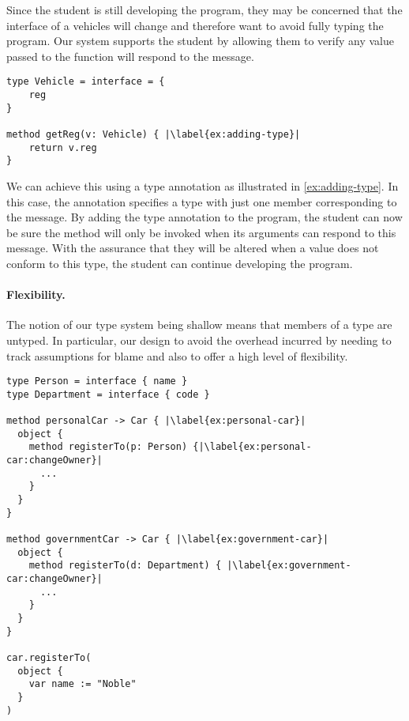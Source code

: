 Since the student is still developing the program, 
they may be concerned that the interface of a vehicles will change 
and therefore want to avoid fully typing the program.
Our system supports the student by allowing them to verify
any value passed to the  function will respond
to the  message. 


\begin{lstlisting}[caption={Adding a type annotation to a method parameter.},escapechar=|,float,floatplacement=htbp]
type Vehicle = interface = {
    reg    
}

method getReg(v: Vehicle) { |\label{ex:adding-type}|
    return v.reg
}
\end{lstlisting}

We can achieve this using a type annotation 
as illustrated in \cref{ex:adding-type}. 
In this case, 
the annotation specifies a type with just one member
corresponding to the  message.
By adding the type annotation to the program, 
the student can now be sure the  method
will only be invoked when its arguments can respond to this message.
With the assurance that they will be altered when a value 
does not conform to this type,
the student can continue developing the program.

\paragraph{Flexibility.}

The notion of our type system being shallow means 
that members of a type are untyped.
In particular, our design 
to avoid the overhead incurred by needing to track assumptions for blame and
also to offer a high level of flexibility.


\begin{lstlisting}[caption={A globally inconsistent program that has a well-typed execution.},escapechar=|,label={ex:complex},float,floatplacement=htbp]
type Person = interface { name }
type Department = interface { code }

method personalCar -> Car { |\label{ex:personal-car}|
  object {
    method registerTo(p: Person) {|\label{ex:personal-car:changeOwner}|
      ...
    } 
  }
}

method governmentCar -> Car { |\label{ex:government-car}|
  object {
    method registerTo(d: Department) { |\label{ex:government-car:changeOwner}|
      ...
    }
  }
}

car.registerTo(
  object {
    var name := "Noble"
  }
)

\end{lstlisting}

